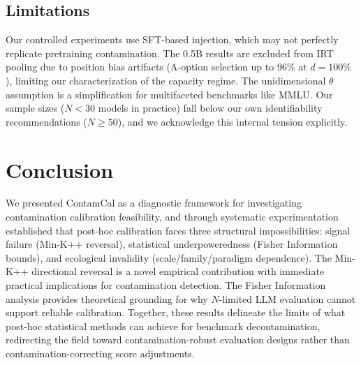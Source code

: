 \documentclass[11pt,a4paper]{article}
\begin{document}
\subsection{Limitations}

Our controlled experiments use SFT-based injection, which may not perfectly replicate pretraining contamination. The 0.5B results are excluded from IRT pooling due to position bias artifacts (A-option selection up to 96\% at $d=100\%$), limiting our characterization of the capacity regime. The unidimensional $\theta$ assumption \citep{reckase2009multidimensional,burnell2023revealing} is a simplification for multifaceted benchmarks like MMLU. Our sample sizes ($N < 30$ models in practice) fall below our own identifiability recommendations ($N \geq 50$), and we acknowledge this internal tension explicitly.

\section{Conclusion}

We presented ContamCal as a diagnostic framework for investigating contamination calibration feasibility, and through systematic experimentation established that post-hoc calibration faces three structural impossibilities: signal failure (Min-K++ reversal), statistical underpoweredness (Fisher Information bounds), and ecological invalidity (scale/family/paradigm dependence). The Min-K++ directional reversal is a novel empirical contribution with immediate practical implications for contamination detection. The Fisher Information analysis provides theoretical grounding for why $N$-limited LLM evaluation cannot support reliable calibration. Together, these results delineate the limits of what post-hoc statistical methods can achieve for benchmark decontamination, redirecting the field toward contamination-robust evaluation designs rather than contamination-correcting score adjustments.
\end{document}
